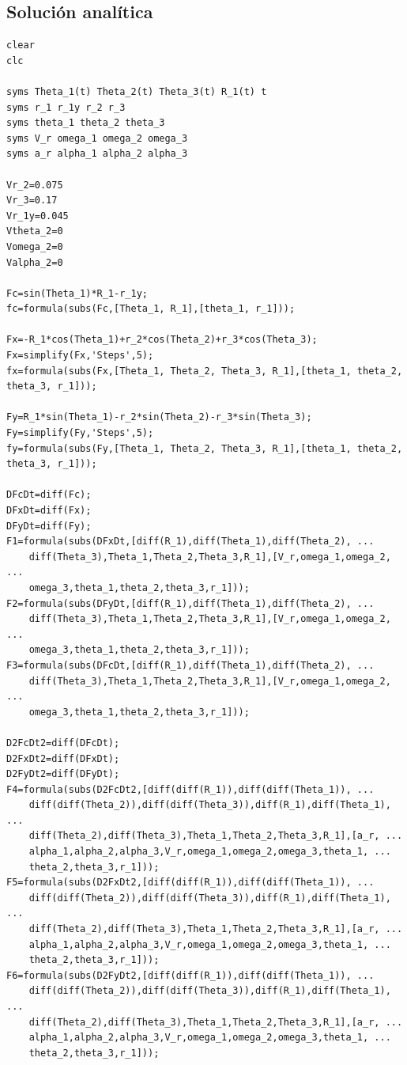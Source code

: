 \documentclass[12pt]{article}
\begin{document}
\subsection{Solución analítica}
\begin{lstlisting}
clear
clc

syms Theta_1(t) Theta_2(t) Theta_3(t) R_1(t) t
syms r_1 r_1y r_2 r_3
syms theta_1 theta_2 theta_3 
syms V_r omega_1 omega_2 omega_3 
syms a_r alpha_1 alpha_2 alpha_3

Vr_2=0.075
Vr_3=0.17
Vr_1y=0.045
Vtheta_2=0
Vomega_2=0
Valpha_2=0

Fc=sin(Theta_1)*R_1-r_1y;
fc=formula(subs(Fc,[Theta_1, R_1],[theta_1, r_1]));

Fx=-R_1*cos(Theta_1)+r_2*cos(Theta_2)+r_3*cos(Theta_3);
Fx=simplify(Fx,'Steps',5);
fx=formula(subs(Fx,[Theta_1, Theta_2, Theta_3, R_1],[theta_1, theta_2, theta_3, r_1]));

Fy=R_1*sin(Theta_1)-r_2*sin(Theta_2)-r_3*sin(Theta_3);
Fy=simplify(Fy,'Steps',5);
fy=formula(subs(Fy,[Theta_1, Theta_2, Theta_3, R_1],[theta_1, theta_2, theta_3, r_1]));

DFcDt=diff(Fc);
DFxDt=diff(Fx);
DFyDt=diff(Fy);
F1=formula(subs(DFxDt,[diff(R_1),diff(Theta_1),diff(Theta_2), ...
    diff(Theta_3),Theta_1,Theta_2,Theta_3,R_1],[V_r,omega_1,omega_2, ...
    omega_3,theta_1,theta_2,theta_3,r_1]));
F2=formula(subs(DFyDt,[diff(R_1),diff(Theta_1),diff(Theta_2), ...
    diff(Theta_3),Theta_1,Theta_2,Theta_3,R_1],[V_r,omega_1,omega_2, ...
    omega_3,theta_1,theta_2,theta_3,r_1]));
F3=formula(subs(DFcDt,[diff(R_1),diff(Theta_1),diff(Theta_2), ...
    diff(Theta_3),Theta_1,Theta_2,Theta_3,R_1],[V_r,omega_1,omega_2, ...
    omega_3,theta_1,theta_2,theta_3,r_1]));

D2FcDt2=diff(DFcDt);
D2FxDt2=diff(DFxDt);
D2FyDt2=diff(DFyDt);
F4=formula(subs(D2FcDt2,[diff(diff(R_1)),diff(diff(Theta_1)), ...
    diff(diff(Theta_2)),diff(diff(Theta_3)),diff(R_1),diff(Theta_1), ...
    diff(Theta_2),diff(Theta_3),Theta_1,Theta_2,Theta_3,R_1],[a_r, ...
    alpha_1,alpha_2,alpha_3,V_r,omega_1,omega_2,omega_3,theta_1, ...
    theta_2,theta_3,r_1]));
F5=formula(subs(D2FxDt2,[diff(diff(R_1)),diff(diff(Theta_1)), ...
    diff(diff(Theta_2)),diff(diff(Theta_3)),diff(R_1),diff(Theta_1), ...
    diff(Theta_2),diff(Theta_3),Theta_1,Theta_2,Theta_3,R_1],[a_r, ...
    alpha_1,alpha_2,alpha_3,V_r,omega_1,omega_2,omega_3,theta_1, ...
    theta_2,theta_3,r_1]));
F6=formula(subs(D2FyDt2,[diff(diff(R_1)),diff(diff(Theta_1)), ...
    diff(diff(Theta_2)),diff(diff(Theta_3)),diff(R_1),diff(Theta_1), ...
    diff(Theta_2),diff(Theta_3),Theta_1,Theta_2,Theta_3,R_1],[a_r, ...
    alpha_1,alpha_2,alpha_3,V_r,omega_1,omega_2,omega_3,theta_1, ...
    theta_2,theta_3,r_1]));



\end{lstlisting}
\end{document}
